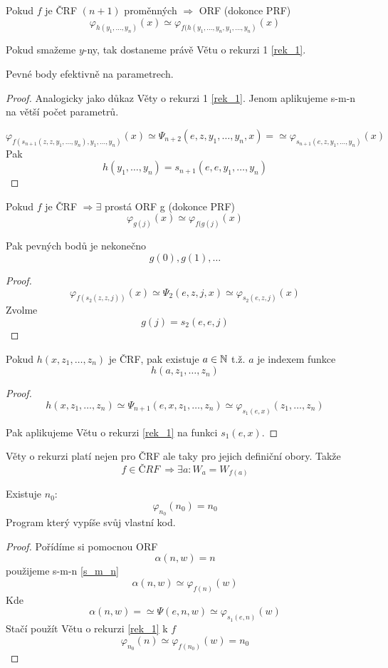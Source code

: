 \begin{theorem}[O rekurzi 2]
	Pokud $f$ je ČRF $(n + 1)$ proměnných $\Rightarrow$ ORF (dokonce PRF)
	\[ \varphi_{h(y_1, \ldots, y_n)}(x) \simeq \varphi_{f(h(y_1, \ldots, y_n, y_1, \ldots, y_n)} (x) \]

	Pokud smažeme $y$-ny, tak dostaneme právě Větu o rekurzi 1 \cref{rek_1}.

	Pevné body efektivně na parametrech.
\end{theorem}
\begin{proof}
	Analogicky jako důkaz Věty o rekurzi 1 \cref{rek_1}.
	Jenom aplikujeme s-m-n na větší počet parametrů.

	\[ \varphi_{f(s_{n + 1}(z, z, y_1, \ldots, y_n), y_1, \ldots, y_n)} (x) \simeq \Psi_{n + 2}(e, z, y_1, \ldots, y_n, x) = \simeq \varphi_{s_{n+1}(e, z, y_1, \ldots, y_n)} (x) \]
	Pak
	\[ h(y_1, \ldots, y_n) = s_{n+1}(e, e, y_1, \ldots, y_n) \]
\end{proof}

\begin{theorem}
	Pokud $f$ je ČRF $\Rightarrow \exists$ prostá ORF g (dokonce PRF)
	\[ \varphi_{g(j)}(x) \simeq \varphi_{f(g(j)} (x) \]

	Pak pevných bodů je nekonečno
	\[ g(0), g(1), \ldots \]
\end{theorem}
\begin{proof}
	\[ \varphi_{f(s_2(z, z, j))} (x) \simeq \Psi_2(e, z, j, x) \simeq \varphi_{s_2(e, z, j)} (x) \]
	Zvolme
	\[ g(j) = s_2(e, e, j) \]
\end{proof}

\begin{theorem}[O rekurzi 3]
	Pokud $h(x, z_1, \ldots, z_n)$ je ČRF, pak existuje $a \in \operatorname{\mathbb{N}}$ t.ž. $a$ je indexem funkce
	\[ h(a, z_1, \ldots, z_n) \]
\end{theorem}
\begin{proof}
	\[ h(x, z_1, \ldots, z_n) \simeq \Psi_{n + 1}(e, x, z_1, \ldots, z_n) \simeq \varphi_{s_1(e, x)} (z_1, \ldots, z_n) \]

	Pak aplikujeme Větu o rekurzi \cref{rek_1} na funkci $s_1(e, x)$.
\end{proof}

\begin{note}
	Věty o rekurzi platí nejen pro ČRF ale taky pro jejich definiční obory.
	Takže
	\[ f \in ČRF\ \Rightarrow \exists a: W_a = W_{f(a)} \]
\end{note}

\begin{theorem}
	Existuje $n_0$:
	\[ \varphi_{n_0} (n_0) = n_0 \]
	Program který vypíše svůj vlastní kod.
\end{theorem}
\begin{proof}
	Pořídíme si pomocnou ORF
	\[ \alpha(n, w) = n \]
	použijeme s-m-n \cref{s_m_n}
	\[ \alpha(n, w) \simeq \varphi_{f(n)} (w) \]
	Kde
	\[ \alpha(n, w) = \simeq \Psi(e, n, w) \simeq \varphi_{s_1(e, n)} (w) \]
	Stačí použít Větu o rekurzi \cref{rek_1} k $f$
	\[ \varphi_{n_0} (n) \simeq \varphi_{f(n_0)} (w) = n_0 \]
\end{proof}

